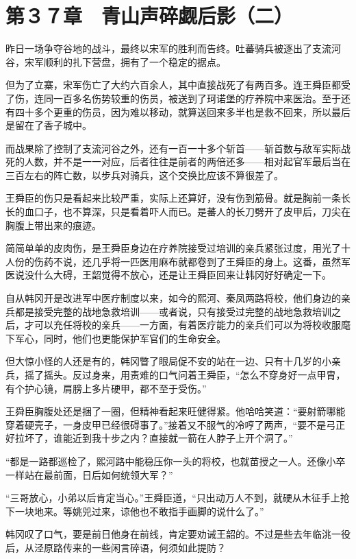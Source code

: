 \section{第３７章　青山声碎觑后影（二）}

昨日一场争夺谷地的战斗，最终以宋军的胜利而告终。吐蕃骑兵被逐出了支流河谷，宋军顺利的扎下营盘，拥有了一个稳定的据点。

但为了立寨，宋军伤亡了大约六百余人，其中直接战死了有两百多。连王舜臣都受了伤，连同一百多名伤势较重的伤员，被送到了珂诺堡的疗养院中来医治。至于还有四十多个更重的伤员，因为难以移动，就算送回来多半也是救不回来，所以最后是留在了香子城中。

而战果除了控制了支流河谷之外，还有一百一十多个斩首——斩首数与敌军实际战死的人数，并不是一一对应，后者往往是前者的两倍还多——相对起官军最后当在三百左右的阵亡数，以步兵对骑兵，这个交换比应该不算很差了。

王舜臣的伤只是看起来比较严重，实际上还算好，没有伤到筋骨。就是胸前一条长长的血口子，也不算深，只是看着吓人而已。是蕃人的长刀劈开了皮甲后，刀尖在胸腹上带出来的痕迹。

简简单单的皮肉伤，是王舜臣身边在疗养院接受过培训的亲兵紧张过度，用光了十人份的伤药不说，还几乎将一匹医用麻布就都卷到了王舜臣的身上。这番，虽然军医说没什么大碍，王韶觉得不放心，还是让王舜臣回来让韩冈好好确定一下。

自从韩冈开是改进军中医疗制度以来，如今的熙河、秦凤两路将校，他们身边的亲兵都是接受完整的战地急救培训——或者说，只有接受过完整的战地急救培训之后，才可以充任将校的亲兵——一方面，有着医疗能力的亲兵们可以为将校收服麾下军心，同时，他们也更能保护军官们的生命安全。

但大惊小怪的人还是有的，韩冈瞥了眼局促不安的站在一边、只有十几岁的小亲兵，摇了摇头。反过身来，用责难的口气问着王舜臣，“怎么不穿身好一点甲胄，有个护心镜，肩膀上多片硬甲，都不至于受伤。”

王舜臣胸腹处还是捆了一圈，但精神看起来旺健得紧。他哈哈笑道：“要射箭哪能穿着硬壳子，一身皮甲已经很碍事了。”接着又不服气的冷哼了两声，“要不是弓正好拉坏了，谁能近到我十步之内？直接就一箭在人脖子上开个洞了。”

“都是一路都巡检了，熙河路中能稳压你一头的将校，也就苗授之一人。还像小卒一样站在最前面，日后如何统领大军？”

“三哥放心，小弟以后肯定当心。”王舜臣道，“只出动万人不到，就硬从木征手上抢下一块地来。等姚兕过来，谅他也不敢指手画脚的说什么了。”

韩冈叹了口气，要是前日他身在前线，肯定要劝诫王韶的。不过是些去年临洮一役后，从泾原路传来的一些闲言碎语，何须如此提防？

